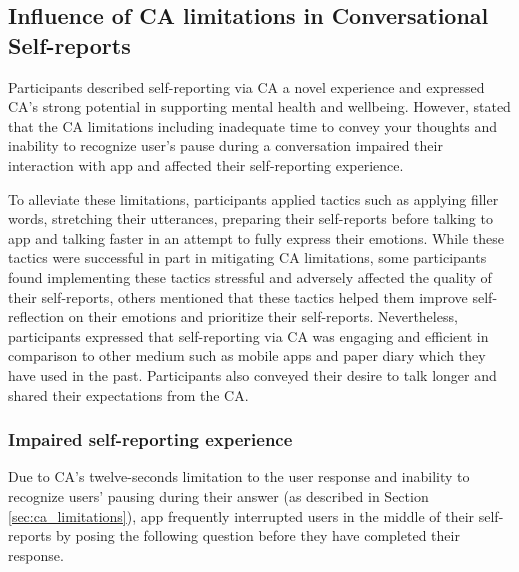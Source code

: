                 
        

\subsection{Influence of \ac{CA} limitations in Conversational Self-reports}
    Participants described self-reporting via \ac{CA} a novel experience and expressed \ac{CA}'s strong potential in supporting mental health and wellbeing. However, stated that the \ac{CA} limitations including
        inadequate time to convey your thoughts and 
        inability to recognize user's pause during a conversation 
    impaired their interaction with \acl{app} and affected their self-reporting experience. 

    To alleviate these limitations, participants applied tactics such as applying filler words, stretching their utterances, preparing their self-reports before talking to \acl{app} and talking faster in an attempt to fully express their emotions.
    While these tactics were successful in part in mitigating \ac{CA} limitations, some participants found implementing these tactics stressful and adversely affected the quality of their self-reports, others mentioned that these tactics helped them improve self-reflection on their emotions and prioritize their self-reports.
    Nevertheless, participants expressed that self-reporting via \ac{CA} was engaging and efficient in comparison to other medium such as mobile apps and paper diary which they have used in the past.
    Participants also conveyed their desire to talk longer and shared their expectations from the \ac{CA}. 
        

    \subsubsection{Impaired self-reporting experience}
        Due to \ac{CA}'s twelve-seconds limitation to the user response and inability to recognize users' pausing during their answer (as described in Section \ref{sec:ca_limitations}), \acl{app} frequently interrupted users in the middle of their self-reports by posing the following question before they have completed their response.
        
